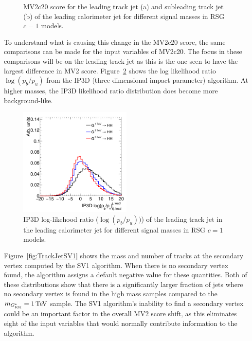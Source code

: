 \begin{figure}[t!]
   \caption{MV2c20 score for the leading track jet (a) and subleading track jet (b) of the leading calorimeter jet for different signal masses in RSG $c=1$ models.}
  \label{fig:TrackJetMV2}
\end{figure}

To understand what is causing this change in the MV2c20 score, the same comparisons can be made for the input variables of MV2c20. The focus in these comparisons will be on the leading track jet as this is the one seen to have the largest difference in MV2 score. Figure~\ref{fig:TrackJetIP3D} shows the log likelihood ratio $\log(p_b/p_u)$ from the IP3D (three dimensional impact parameter) algorithm. At higher masses, the IP3D likelihood ratio distribution does become more background-like. 

\begin{figure}[h!]
  \centering
  \captionsetup{justification=centering}

  \includegraphics[width=0.5\textwidth]{figures/LeadTrackJet_IP3D}
  \caption{IP3D log-likehood ratio ($\log(p_b/p_u))$) of the leading track jet in the leading calorimeter jet for different signal masses in RSG $c=1$ models.}
  \label{fig:TrackJetIP3D}
\end{figure}
%
Figure~\ref{fig:TrackJetSV1} shows the mass and number of tracks at the secondary vertex computed by the SV1 algorithm. When there is no secondary vertex found, the algorithm assigns a default negative value for these quantities. Both of these distributions show that there is a significantly larger fraction of jets where no secondary vertex is found in the high mass samples compared to the $m_{\Gkk} = 1 \TeV$ sample. The SV1 algorithm's inability to find a secondary vertex could be an important factor in the overall MV2 score shift, as this eliminates eight of the input variables that would normally contribute information to the algorithm. 

